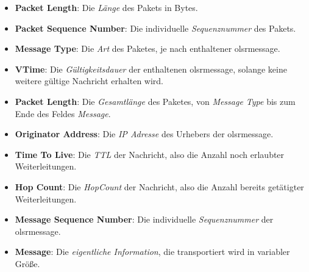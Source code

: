 \begin{itemize}
\item \textbf{Packet Length}: Die \textit{Länge} des Pakets in Bytes.
\item \textbf{Packet Sequence Number}: Die individuelle \textit{Sequenznummer} des Pakets.
\item \textbf{Message Type}: Die \textit{Art} des Paketes, je nach enthaltener \gls{olsrmessage}.
\item \textbf{VTime}: Die \textit{Gültigkeitsdauer} der enthaltenen \gls{olsrmessage}, solange keine weitere gültige Nachricht erhalten wird.
\item \textbf{Packet Length}: Die \textit{Gesamtlänge} des Paketes, von \textit{Message Type} bis zum Ende des Feldes \textit{Message}.
\item \textbf{Originator Address}: Die \textit{IP Adresse} des Urhebers der \gls{olsrmessage}.
\item \textbf{Time To Live}: Die \textit{TTL} der Nachricht, also die Anzahl noch erlaubter Weiterleitungen.
\item \textbf{Hop Count}: Die \textit{HopCount} der Nachricht, also die Anzahl bereits getätigter Weiterleitungen.
\item \textbf{Message Sequence Number}: Die individuelle \textit{Sequenznummer} der \gls{olsrmessage}.
\item \textbf{Message}: Die \textit{eigentliche Information}, die transportiert wird in variabler Größe.
\end{itemize}

